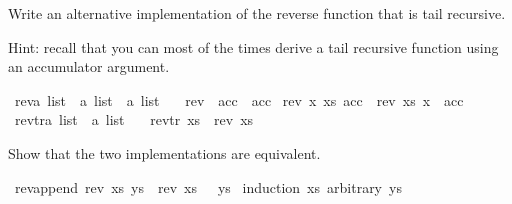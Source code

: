 \begin{isabellebody}
\begin{isamarkuptext}
  Write an alternative implementation of the reverse function that is tail recursive.

  Hint: recall that you can most of the times derive a tail recursive function using an accumulator
        argument.%
\end{isamarkuptext}\isamarkuptrue%
\isamarkupfalse%
\ rev{\isacharprime}{\kern0pt}{\isacharcolon}{\kern0pt}{\isacharcolon}{\kern0pt}{\isachardoublequoteopen}{\isacharprime}{\kern0pt}a\ list\ {\isasymRightarrow}\ {\isacharprime}{\kern0pt}a\ list\ {\isasymRightarrow}\ {\isacharprime}{\kern0pt}a\ list{\isachardoublequoteclose}\ \isanewline
\ \ {\isachardoublequoteopen}rev{\isacharprime}{\kern0pt}\ {\isacharbrackleft}{\kern0pt}{\isacharbrackright}{\kern0pt}\ acc\ {\isacharequal}{\kern0pt}\ acc{\isachardoublequoteclose}\isanewline
{\isacharbar}{\kern0pt}\ {\isachardoublequoteopen}rev{\isacharprime}{\kern0pt}\ {\isacharparenleft}{\kern0pt}x\ {\isacharhash}{\kern0pt}xs{\isacharparenright}{\kern0pt}\ acc\ {\isacharequal}{\kern0pt}\ rev{\isacharprime}{\kern0pt}\ xs\ {\isacharparenleft}{\kern0pt}x\ {\isacharhash}{\kern0pt}\ acc{\isacharparenright}{\kern0pt}{\isachardoublequoteclose}\isanewline
\isanewline
\isanewline
\isanewline
\isanewline
{}\isamarkupfalse%
\ rev{\isacharunderscore}{\kern0pt}tr{\isacharcolon}{\kern0pt}{\isacharcolon}{\kern0pt}{\isachardoublequoteopen}{\isacharprime}{\kern0pt}a\ list\ {\isasymRightarrow}\ {\isacharprime}{\kern0pt}a\ list{\isachardoublequoteclose}\ \isanewline
\isanewline
\ \ {\isachardoublequoteopen}rev{\isacharunderscore}{\kern0pt}tr\ xs\ {\isacharequal}{\kern0pt}\ rev{\isacharprime}{\kern0pt}\ xs\ {\isacharbrackleft}{\kern0pt}{\isacharbrackright}{\kern0pt}{\isachardoublequoteclose}%
\begin{isamarkuptext}%
Show that the two implementations are equivalent.%
\end{isamarkuptext}\isamarkuptrue%
\isamarkupfalse%
\ rev{\isacharprime}{\kern0pt}{\isacharunderscore}{\kern0pt}append{\isacharcolon}{\kern0pt}\ {\isachardoublequoteopen}rev{\isacharprime}{\kern0pt}\ xs\ ys\ {\isacharequal}{\kern0pt}\ {\isacharparenleft}{\kern0pt}rev{\isacharprime}{\kern0pt}\ xs\ {\isacharbrackleft}{\kern0pt}{\isacharbrackright}{\kern0pt}{\isacharparenright}{\kern0pt}\ {\isacharat}{\kern0pt}\ ys{\isachardoublequoteclose}\isanewline
%
\isadelimproof
%
\endisadelimproof
%
\isatagproof
{}\isamarkupfalse%
\ {\isacharparenleft}{\kern0pt}induction\ xs\ arbitrary{\isacharcolon}{\kern0pt}\ ys{\isacharparenright}{\kern0pt}\isanewline

\end{isabellebody}
